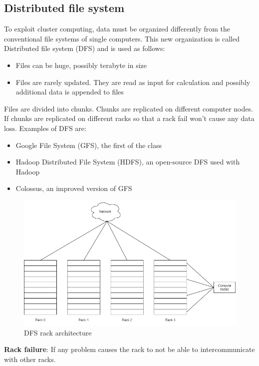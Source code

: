 \documentclass[\main/main.tex]{subfiles}
\begin{document}
\subsection{Distributed file system}
To exploit cluster computing, data must be organized differently from the conventional file systems of single computers. This new organization is called Distributed file system (DFS) and is used as follows:
\begin{itemize}
    \item Files can be huge, possibly terabyte in size
    \item Files are rarely updated. They are read as input for calculation and possibly additional data is appended to files
\end{itemize}
Files are divided into chunks. Chunks are replicated on different computer nodes. If chunks are replicated on different racks so that a rack fail won't cause any data loss.
Examples of DFS are:
\begin{itemize}
    \item Google File System (GFS), the first of the class
    \item Hadoop Distributed File System (HDFS), an open-source DFS used with Hadoop
    \item Colossus, an improved version of GFS
\end{itemize}
\begin{figure}[h]
    \centering
    \includegraphics[scale=0.35]{images/cluster_computing/racks_dfs.png}
    \caption{DFS rack architecture}
    \label{fig:racks_dfs}
\end{figure}
\textbf{Rack failure}: If any problem causes the rack to not be able to intercommunicate with other racks.
\end{document}
